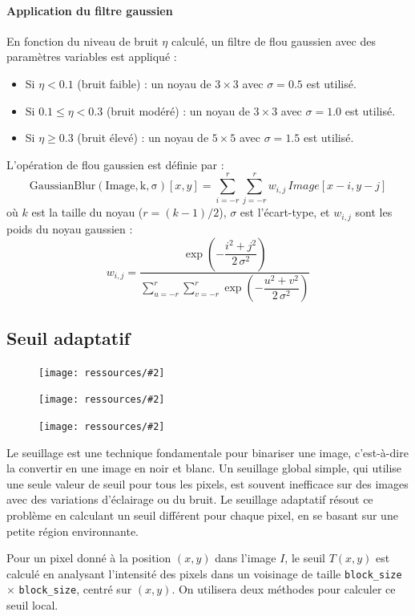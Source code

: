 \documentclass{article}
\newcommand{\stepimage}[3][0.3\textwidth]{%
  \minipage{#1}
    \texttt{[image: ressources/\#2]}
    \caption{#3}
  \endminipage\hfill
}
\begin{document}
\paragraph{Application du filtre gaussien}
En fonction du niveau de bruit \(\eta\) calculé, un filtre de flou gaussien avec des paramètres variables est appliqué :
\begin{itemize}
    \item Si $\eta < 0.1$ (bruit faible) : un noyau de \(3 \times 3\) avec \(\sigma = 0.5\) est utilisé.
    \item Si $0.1 \leq \eta < 0.3$ (bruit modéré) : un noyau de \(3 \times 3\) avec \(\sigma = 1.0\) est utilisé.
    \item Si $\eta \geq 0.3$ (bruit élevé) : un noyau de \(5 \times 5\) avec \(\sigma = 1.5\) est utilisé.
\end{itemize}
L'opération de flou gaussien est définie par :
\[
\operatorname{GaussianBlur(Image, k, \sigma)}[x,y] = \sum_{i=-r}^{r} \sum_{j=-r}^{r} w_{i,j}\, Image[x-i, y-j]
\]
où \(k\) est la taille du noyau (\(r = (k-1)/2\)), \(\sigma\) est l'écart-type, et \(w_{i,j}\) sont les poids du noyau gaussien :
\[
w_{i,j} = \frac{\exp\!\left(-\dfrac{i^{2}+j^{2}}{2\,\sigma^{2}}\right)}{\displaystyle \sum_{u=-r}^{r} \sum_{v=-r}^{r} \exp\!\left(-\dfrac{u^{2}+v^{2}}{2\,\sigma^{2}}\right)}
\]

\subsection{Seuil adaptatif}
\begin{figure}[!htb]
    \stepimage[0.30\textwidth]{1step_03_threshold.png}{}
    \stepimage[0.33\textwidth]{2step_03_threshold.png}{}
    \stepimage[0.26\textwidth]{3step_03_threshold.png}{}
\end{figure}
Le seuillage est une technique fondamentale pour binariser une image, c'est-à-dire la convertir en une image en noir et blanc. Un seuillage global simple, qui utilise une seule valeur de seuil pour tous les pixels, est souvent inefficace sur des images avec des variations d'éclairage ou du bruit. Le seuillage adaptatif résout ce problème en calculant un seuil différent pour chaque pixel, en se basant sur une petite région environnante.

Pour un pixel donné à la position \((x, y)\) dans l'image \(I\), le seuil \(T(x, y)\) est calculé en analysant l'intensité des pixels dans un voisinage de taille \texttt{block\_size} \(\times\) \texttt{block\_size}, centré sur \((x, y)\). On utilisera deux méthodes pour calculer ce seuil local.
\end{document}
